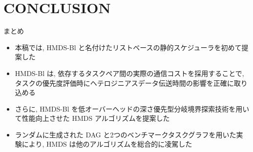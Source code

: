 
\section{CONCLUSION}
\label{sec: conclusion}

\begin{frame}{まとめ}
    \begin{itemize}
        \item 本稿では, HMDS-Bl と名付けたリストベースの静的スケジューラを初めて提案した
        \item HMDS-Bl は, 依存するタスクペア間の実際の通信コストを採用することで, タスクの優先度評価時にヘテロジニアスデータ伝送時間の影響を正確に取り込める
        \item さらに, HMDS-Bl を低オーバーヘッドの深さ優先型分岐境界探索技術を用いて性能向上させた HMDS アルゴリズムを提案した
        \item ランダムに生成された DAG と2つのベンチマークタスクグラフを用いた実験により, HMDS は他のアルゴリズムを総合的に凌駕した
    \end{itemize}
\end{frame}
